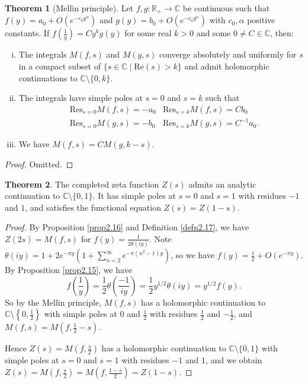 \documentclass{article}
\theoremstyle{definition}
\newtheorem{theorem}{Theorem}[section]
\begin{document}
\begin{theorem}[Mellin principle]\label{theorem2.18}
    Let $f,g : \mathbb{R}_+ \to \mathbb{C}$ be continuous such that $f(y) = a_0 + O(e^{-c_0 y^{\alpha}})$ and $g(y) = b_0 + O(e^{-c_0 y^{\alpha}})$ with $c_0, \alpha$ positive constants. If $f \left(\frac{1}{y}\right) = Cy^k g(y)$ for some real $k>0$ and some $0 \neq C \in \mathbb{C}$, then:
    \begin{enumerate}[(i)]
        \item The integrals $M(f,s)$ and $M(g,s)$ converge absolutely and uniformly for $s$ in a compact subset of $\{s \in \mathbb{C} \mid  \text{Re}(s)>k\}$ and admit holomorphic continuations to $\mathbb{C} \setminus  \{0,k\}$.
        \item The integrals have simple poles at $s=0$ and $s=k$ such that 
        \begin{align*}
            &\text{Res}_{s=0} M(f,s) = - a_0 &\text{Res}_{s=k} M(f,s) = C b_0\\
            &\text{Res}_{s=0} M(g,s) = -b_0 &\text{Res}_{s=k} M(g,s) = C^{-1} a_0.
        \end{align*}
        \item We have $M(f,s) = C M(g,k-s)$.
    \end{enumerate}
\end{theorem}
\begin{proof}
    Omitted.
\end{proof}
\begin{theorem}\label{theorem2.19}
    The completed zeta function $Z(s)$ admits an analytic continuation to $\mathbb{C}\setminus \{0,1\}$. It has simple poles at $s=0$ and $s=1$ with residues $-1$ and $1$, and satisfies the functional equation $Z(s)=Z(1-s)$.
\end{theorem}
\begin{proof}
    By Proposition \ref{prop2.16} and Definition \ref{defn2.17}, we have $Z(2s) = M(f,s)$ for $f(y) = \frac{1}{2\theta(iy)}$. Note $\theta(iy) = 1 + 2e^{-\pi y}(1+ \sum_{n=2}^{\infty} e^{-\pi(n^2-1)y})$, so we have $f(y) =\frac{1}{2} + O(e^{-\pi y})$. By Proposition \ref{prop2.15}, we have $$f \left(\frac{1}{y}\right) = \frac{1}{2}\theta(\frac{-1}{iy}) = \frac{1}{2}y^{1/2}\theta(iy) = y^{1/2}f(y).$$ So by the Mellin principle, $M(f,s)$ has a holomorphic continuation to $\mathbb{C}\setminus \left\{0,\frac{1}{2}\right\}$ with simple poles at $0$ and $\frac{1}{2}$ with residues $\frac{1}{2}$ and $-\frac{1}{2}$, and $M(f,s) = M(f,\frac{1}{2}-s)$. 
    
    \vspace{1mm}
     
    Hence $Z(s) = M\left(f,\frac{s}{2}\right)$ has a holomorphic continuation to $\mathbb{C} \setminus \{0,1\}$ with simple poles at $s=0$ and $s=1$ with residues $-1$ and $1$, and we obtain $Z(s) = M\left(f,\frac{s}{2}\right) = M \left(f, \frac{1-s}{2}\right) = Z(1-s)$.
\end{proof}
\end{document}
